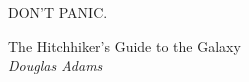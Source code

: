 \documentclass[tcc]{subfile}
\begin{document}
\begin{epigrafe}
    \vspace*{\fill}
	\begin{flushright}
        \epigraph{\centering\huge DON'T PANIC.}{The Hitchhiker's Guide to the Galaxy\\\emph{Douglas Adams}}
	\end{flushright}
\end{epigrafe}
\end{document}
